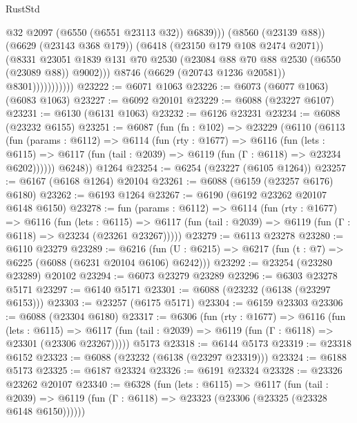 \begin{lexlean}{RustStd}
\begin{coremodule}
                                  @32
                                  @2097
                                  (@6550 (@6551 @23113 @32))
                                  @6839)))
                            (@8560 (@23139 @88))
                            (@6629 (@23143 @368 @179))
                            (@6418 (@23150 @179 @108 @2474 @2071))
                            (@8331
                              @23051
                              @1839
                              @131
                              @70
                              @2530
                              (@23084 @88 @70 @88 @2530 (@6550 (@23089 @88)) @9002)))
                          @8746
                          (@6629 (@20743 @1236 @20581))
                          @8301)))))))))))
@23222 := @6071 @1063
@23226 := @6073 (@6077 @1063) (@6083 @1063)
@23227 := @6092 @20101
@23229 := @6088 (@23227 @6107)
@23231 := @6130 (@6131 @1063)
@23232 := @6126 @23231
@23234 := @6088 (@23232 @6155)
@23251 := @6087
    (fun (fn : @102) =>
    @23229
      (@6110
        (@6113
          (fun (params : @6112) =>
          @6114
            (fun (rty : @1677) =>
            @6116
              (fun (lets : @6115) =>
              @6117 (fun (tail : @2039) => @6119 (fun (Γ : @6118) => @23234 @6202))))))
        @6248))
    @1264
@23254 := @6254 (@23227 (@6105 @1264))
@23257 := @6167 (@6168 @1264) @20104
@23261 := @6088 (@6159 (@23257 @6176) @6180)
@23262 := @6193 @1264
@23267 := @6190 (@6192 @23262 @20107 @6148 @6150)
@23278 := fun (params : @6112) =>
  @6114
    (fun (rty : @1677) =>
    @6116
      (fun (lets : @6115) =>
      @6117 (fun (tail : @2039) => @6119 (fun (Γ : @6118) => @23234 (@23261 @23267)))))
@23279 := @6113 @23278
@23280 := @6110 @23279
@23289 := @6216
    (fun (U : @6215) => @6217 (fun (t : @7) => @6225 (@6088 (@6231 @20104 @6106) @6242)))
@23292 := @23254 (@23280 @23289) @20102
@23294 := @6073 @23279 @23289
@23296 := @6303 @23278 @5171
@23297 := @6140 @5171
@23301 := @6088 (@23232 (@6138 (@23297 @6153)))
@23303 := @23257 (@6175 @5171)
@23304 := @6159 @23303
@23306 := @6088 (@23304 @6180)
@23317 := @6306
    (fun (rty : @1677) =>
    @6116
      (fun (lets : @6115) =>
      @6117 (fun (tail : @2039) => @6119 (fun (Γ : @6118) => @23301 (@23306 @23267)))))
    @5173
@23318 := @6144 @5173
@23319 := @23318 @6152
@23323 := @6088 (@23232 (@6138 (@23297 @23319)))
@23324 := @6188 @5173
@23325 := @6187 @23324
@23326 := @6191 @23324
@23328 := @23326 @23262 @20107
@23340 := @6328
    (fun (lets : @6115) =>
    @6117
      (fun (tail : @2039) =>
      @6119 (fun (Γ : @6118) => @23323 (@23306 (@23325 (@23328 @6148 @6150))))))

\end{coremodule}
\end{lexlean}
